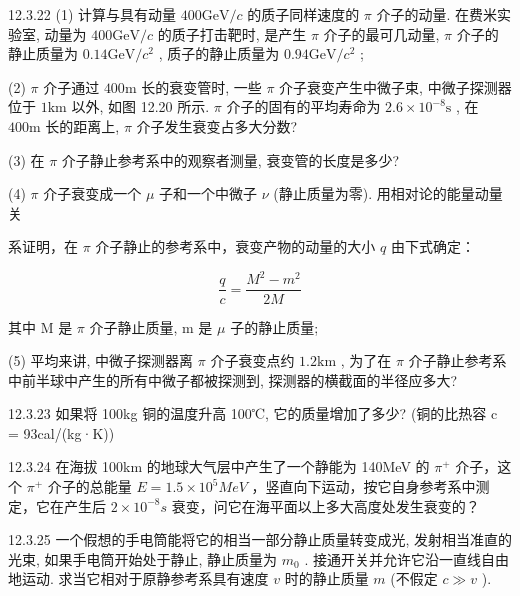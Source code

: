 \begin{problem}{12.3.22}
(1) 计算与具有动量 $400\mathrm{GeV} / c$ 的质子同样速度的 $\pi$ 介子的动量. 在费米实验室, 动量为 $400\mathrm{GeV} / c$ 的质子打击靶时, 是产生 $\pi$ 介子的最可几动量, $\pi$ 介子的静止质量为 $0.14\mathrm{GeV} / c^2$ , 质子的静止质量为 $0.94\mathrm{GeV} / c^2$ ;

(2) $\pi$ 介子通过 $400\mathrm{m}$ 长的衰变管时, 一些 $\pi$ 介子衰变产生中微子束, 中微子探测器位于 $1\mathrm{km}$ 以外, 如图 12.20 所示. $\pi$ 介子的固有的平均寿命为 $2.6 \times 10^{-8}\mathrm{s}$ , 在 $400\mathrm{m}$ 长的距离上, $\pi$ 介子发生衰变占多大分数?

(3) 在 $\pi$ 介子静止参考系中的观察者测量, 衰变管的长度是多少?

(4) $\pi$ 介子衰变成一个 $\mu$ 子和一个中微子 $\nu$ (静止质量为零). 用相对论的能量动量关

系证明，在 $\pi$ 介子静止的参考系中，衰变产物的动量的大小 $q$ 由下式确定：

\[
\frac {q}{c} = \frac {M ^ {2} - m ^ {2}}{2 M}
\]

其中 M 是 $\pi$ 介子静止质量, m 是 $\mu$ 子的静止质量;

(5) 平均来讲, 中微子探测器离 $\pi$ 介子衰变点约 $1.2\mathrm{km}$ , 为了在 $\pi$ 介子静止参考系中前半球中产生的所有中微子都被探测到, 探测器的横截面的半径应多大?
\begin{center}

\end{center}
\end{problem}
\clearpage


\begin{problem}{12.3.23}
如果将 100kg 铜的温度升高 100℃, 它的质量增加了多少? (铜的比热容 c = 93cal/(kg·K))
\end{problem}
\clearpage


\begin{problem}{12.3.24}
在海拔 100km 的地球大气层中产生了一个静能为 140MeV 的 $\pi^{+}$ 介子，这个 $\pi^{+}$ 介子的总能量 $E=1.5\times10^{5}MeV$ ，竖直向下运动，按它自身参考系中测定，它在产生后 $2\times10^{-8}s$ 衰变，问它在海平面以上多大高度处发生衰变的？
\end{problem}
\clearpage


\begin{problem}{12.3.25}
一个假想的手电筒能将它的相当一部分静止质量转变成光, 发射相当准直的光束, 如果手电筒开始处于静止, 静止质量为 $m_0$ . 接通开关并允许它沿一直线自由地运动. 求当它相对于原静参考系具有速度 $v$ 时的静止质量 $m$ (不假定 $c \gg v$ ).
\end{problem}
\clearpage


